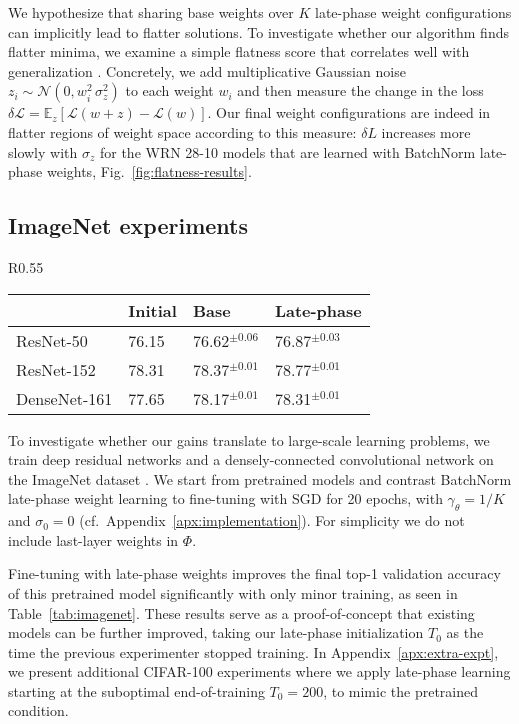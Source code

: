 \documentclass{article} \usepackage{iclr2021_conference,times}
\begin{document}
We hypothesize that sharing base weights over $K$ late-phase weight configurations can implicitly lead to flatter solutions. To investigate whether our algorithm finds flatter minima, we examine a simple flatness score that correlates well with generalization \citep{pittorino_entropic_2020,jiang_fantastic_2020}. Concretely, we add multiplicative Gaussian noise $z_i \sim \mathcal{N}(0, w_i^2 \, \sigma_z^2)$ to each weight $w_i$ and then measure the change in the loss
$\delta\mathcal{L} = \mathbb{E}_z [\mathcal{L}(w + z) - \mathcal{L}(w)]$. Our final weight configurations are indeed in flatter regions of weight space according to this measure: $\delta L$ increases more slowly with $\sigma_z$ for the WRN 28-10 models that are learned with BatchNorm late-phase weights, Fig.~\ref{fig:flatness-results}.


\subsection{ImageNet experiments}
\setlength\intextsep{0pt}
\begin{wraptable}[10]{R}{0.55\textwidth}
\vspace{-0.05cm}
\centering
  \caption{Validation set acc.~(\%) on ImageNet. Mean $\pm$ std.~over 5 seeds. BatchNorm late-phase and baseline trained for 20 epochs with SGD.}
  \label{tab:imagenet}
\begin{tabular}{llll}
\toprule
           & Initial & Base & Late-phase \\\midrule
ResNet-50  & 76.15 & 76.62$^{\pm 0.06}$ & 76.87$^{\pm 0.03}$ \\
ResNet-152  & 78.31 & 78.37$^{\pm 0.01}$ & 78.77$^{\pm 0.01}$ \\
DenseNet-161  & 77.65 & 78.17$^{\pm 0.01}$ & 78.31$^{\pm 0.01}$ \\
\midrule
\end{tabular}
\end{wraptable}
To investigate whether our gains translate to large-scale learning problems, we train deep residual networks \citep{he_deep_2016} and a densely-connected convolutional network \citep[DenseNet;][]{huang_densely_2018} on the ImageNet dataset \citep{russakovsky_imagenet_2015}. We start from pretrained models and contrast BatchNorm late-phase weight learning to fine-tuning with SGD for 20 epochs, with $\gamma_\theta=1/K$ and $\sigma_0=0$ (cf.~Appendix~\ref{apx:implementation}). For simplicity we do not include last-layer weights in $\Phi$.


Fine-tuning with late-phase weights improves the final top-1 validation accuracy of this pretrained model significantly with only minor training, as seen in Table~\ref{tab:imagenet}. These results serve as a proof-of-concept that existing models can be further improved, taking our late-phase initialization $T_0$ as the time the previous experimenter stopped training. In Appendix~\ref{apx:extra-expt}, we present additional CIFAR-100 experiments where we apply late-phase learning starting at the suboptimal end-of-training $T_0=200$, to mimic the pretrained condition.
\end{document}
